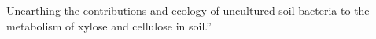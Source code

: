 Unearthing the contributions and ecology of uncultured soil bacteria to the metabolism of xylose and cellulose in soil.”
